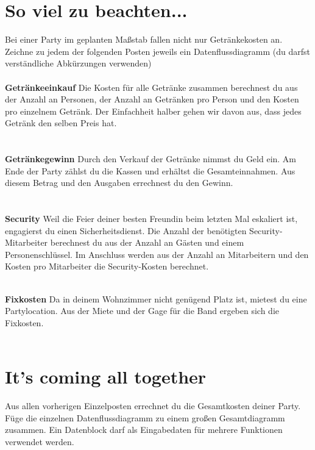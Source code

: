     \section{So viel zu beachten...}
    Bei einer Party im geplanten Maßstab fallen nicht nur Getränkekosten an. Zeichne zu jedem der folgenden Posten jeweils ein Datenflussdiagramm (du darfst verständliche Abkürzungen verwenden)\\\\
    
    \large\textbf{Getränkeeinkauf} \normalsize \hspace{0.2cm}
    Die Kosten für alle Getränke zusammen berechnest du aus der Anzahl an Personen, der Anzahl an Getränken pro Person und den Kosten pro einzelnem Getränk. Der Einfachheit halber gehen wir davon aus, dass jedes Getränk den selben Preis hat.\\
    \\\\
    
    \large\textbf{Getränkegewinn} \normalsize \hspace{0.2cm}
    Durch den Verkauf der Getränke nimmst du Geld ein. Am Ende der Party zählst du die Kassen und erhältst die Gesamteinnahmen. Aus diesem Betrag und den Ausgaben errechnest du den Gewinn.\\
    \\\\
    
    \large\textbf{Security} \normalsize \hspace{0.2cm}
    Weil die Feier deiner besten Freundin beim letzten Mal eskaliert ist, engagierst du einen Sicherheitsdienst. Die Anzahl der benötigten Security-Mitarbeiter berechnest du aus der Anzahl an Gästen und einem Personenschlüssel. Im Anschluss werden aus der Anzahl an Mitarbeitern und den Kosten pro Mitarbeiter die Security-Kosten berechnet.\\
    \\
    
    \newpage
    
    \large\textbf{Fixkosten} \normalsize \hspace{0.2cm}
    Da in deinem Wohnzimmer nicht genügend Platz ist, mietest du eine Partylocation. Aus der Miete und der Gage für die Band ergeben sich die Fixkosten.\\
    \\
    
    \section{It's coming all together}
    Aus allen vorherigen Einzelposten errechnet du die Gesamtkosten deiner Party. Füge die einzelnen Datenflussdiagramm zu einem großen Gesamtdiagramm zusammen. Ein Datenblock darf als Eingabedaten für mehrere Funktionen verwendet werden.\\
